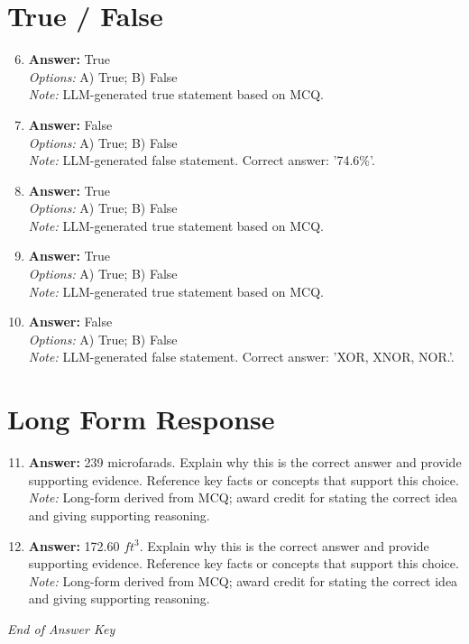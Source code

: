 \documentclass[12pt]{article}
\begin{document}
\section*{True / False}
\begin{enumerate}[label=\arabic*.]
\setcounter{enumi}{5}
\item \textbf{Answer:} True
\\ \textit{Options:} A) True; B) False
\\ \textit{Note:} LLM-generated true statement based on MCQ.
\item \textbf{Answer:} False
\\ \textit{Options:} A) True; B) False
\\ \textit{Note:} LLM-generated false statement. Correct answer: '74.6\%'.
\item \textbf{Answer:} True
\\ \textit{Options:} A) True; B) False
\\ \textit{Note:} LLM-generated true statement based on MCQ.
\item \textbf{Answer:} True
\\ \textit{Options:} A) True; B) False
\\ \textit{Note:} LLM-generated true statement based on MCQ.
\item \textbf{Answer:} False
\\ \textit{Options:} A) True; B) False
\\ \textit{Note:} LLM-generated false statement. Correct answer: 'XOR, XNOR, NOR.'.
\end{enumerate}

\section*{Long Form Response}
\begin{enumerate}[label=\arabic*.]
\setcounter{enumi}{10}
\item \textbf{Answer:} 239 microfarads. Explain why this is the correct answer and provide supporting evidence. Reference key facts or concepts that support this choice.
\\ \textit{Note:} Long-form derived from MCQ; award credit for stating the correct idea and giving supporting reasoning.
\item \textbf{Answer:} 172.60 $ft^3$. Explain why this is the correct answer and provide supporting evidence. Reference key facts or concepts that support this choice.
\\ \textit{Note:} Long-form derived from MCQ; award credit for stating the correct idea and giving supporting reasoning.
\end{enumerate}

\vfill
\noindent\textit{End of Answer Key}
\end{document}
